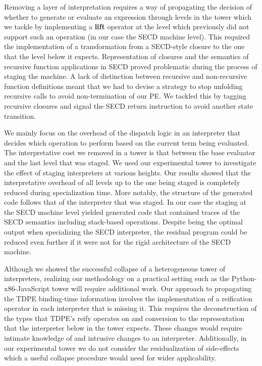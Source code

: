 \documentclass[a4paper,12pt,twoside,openright]{report}
\theoremstyle{definition}
\begin{document}
Removing a layer of interpretation requires a way of propagating the decision of whether to generate or evaluate an expression through levels in the tower which we tackle by implementing a \textbf{lift} operator at the level which previously did not support such an operation (in our case the SECD machine level). This required the implementation of a transformation from a SECD-style closure to the one that the level below it expects.
Representation of closures and the semantics of recursive function applications in SECD proved problematic during the process of staging the machine. A lack of distinction between recursive and non-recursive function definitions meant that we had to devise a strategy to stop unfolding recursive calls to avoid non-termination of our PE. We tackled this by tagging recursive closures and signal the SECD return instruction to avoid another state transition.

We mainly focus on the overhead of the dispatch logic in an interpreter that decides which operation to perform based on the current term being evaluated. The interpretative cost we removed in a tower is that between the base evaluator and the last level that was staged. We used our experimental tower to investigate the effect of staging interpreters at various heights. Our results showed that the interpretative overhead of all levels up to the one being staged is completely reduced during specialization time. More notably, the structure of the generated code follows that of the interpreter that was staged. In our case the staging at the SECD machine level yielded generated code that contained traces of the SECD semantics including stack-based operations. Despite being the optimal output when specializing the SECD interpreter, the residual program could be reduced even further if it were not for the rigid architecture of the SECD machine.

Although we showed the successful collapse of a heterogeneous tower of interpreters, realizing our methodology on a practical setting such as the Python-x86-JavaScript tower will require additional work. Our approach to propagating the TDPE binding-time information involves the implementation of a reification operator in each interpreter that is missing it. This requires the deconstruction of the types that TDPE's reify operates on and conversion to the representation that the interpreter below in the tower expects. These changes would require intimate knowledge of and intrusive changes to an interpreter. Additionally, in our experimental tower we do not consider the residualization of side-effects which a useful collapse procedure would need for wider applicability.
\end{document}
